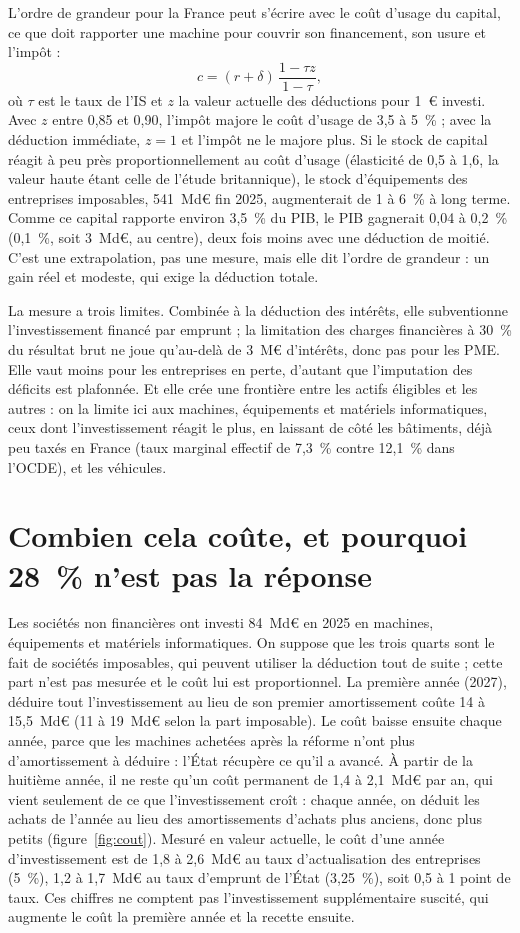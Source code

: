 \documentclass[11pt,a4paper]{article}
\begin{document}
L'ordre de grandeur pour la France peut s'écrire avec le coût d'usage du capital, ce que doit rapporter une
machine pour couvrir son financement, son usure et l'impôt :
\[
c = (r+\delta)\,\frac{1-\tau z}{1-\tau},
\]
où $\tau$ est le taux de l'IS et $z$ la valeur actuelle des déductions pour 1~€ investi. Avec $z$ entre 0,85
et 0,90, l'impôt majore le coût d'usage de 3,5 à 5~\% ; avec la déduction immédiate, $z = 1$ et l'impôt ne le
majore plus. Si le stock de capital réagit à peu près proportionnellement au coût d'usage (élasticité de 0,5 à 1,6, la
valeur haute étant celle de l'étude britannique), le stock d'équipements des entreprises imposables, 541~Md€
fin 2025, augmenterait de 1 à 6~\% à long terme. Comme ce capital rapporte environ 3,5~\% du PIB, le PIB
gagnerait 0,04 à 0,2~\% (0,1~\%, soit 3~Md€, au centre), deux fois moins avec une déduction de moitié.
C'est une extrapolation, pas une mesure, mais elle dit l'ordre de grandeur : un gain réel et modeste, qui
exige la déduction totale.

La mesure a trois limites. Combinée à la déduction des intérêts, elle subventionne l'investissement financé
par emprunt ; la limitation des charges financières à 30~\% du résultat brut ne joue qu'au-delà de 3~M€
d'intérêts, donc pas pour les PME. Elle vaut moins
pour les entreprises en perte, d'autant que l'imputation des déficits est plafonnée. Et elle crée une
frontière entre les actifs éligibles et les autres : on la limite ici aux machines, équipements et
matériels informatiques, ceux dont l'investissement réagit le plus, en laissant de côté les bâtiments, déjà
peu taxés en France (taux marginal effectif de 7,3~\% contre 12,1~\% dans l'OCDE), et les véhicules.

\section{Combien cela coûte, et pourquoi 28~\% n'est pas la réponse}

Les sociétés non financières ont investi 84~Md€ en 2025 en machines, équipements et matériels
informatiques. On suppose que les trois quarts sont le fait de sociétés imposables, qui peuvent utiliser la
déduction tout de suite ; cette part n'est pas mesurée et le coût lui est proportionnel. La première année
(2027), déduire tout l'investissement au lieu de son premier amortissement coûte 14 à 15,5~Md€ (11 à 19~Md€
selon la part imposable). Le coût baisse ensuite chaque année, parce que les machines achetées après la
réforme n'ont plus d'amortissement à déduire : l'État récupère ce qu'il a avancé. À partir de la huitième
année, il ne reste qu'un coût permanent de 1,4 à 2,1~Md€ par an, qui vient seulement de ce que
l'investissement croît : chaque année, on déduit les achats de l'année au lieu des amortissements d'achats
plus anciens, donc plus petits (figure~\ref{fig:cout}). Mesuré en valeur actuelle, le coût d'une année
d'investissement est de 1,8 à 2,6~Md€ au taux d'actualisation des entreprises (5~\%), 1,2 à 1,7~Md€ au taux
d'emprunt de l'État (3,25~\%), soit 0,5 à 1 point de taux. Ces chiffres ne comptent pas l'investissement
supplémentaire suscité, qui augmente le coût la première année et la recette ensuite.
\end{document}
